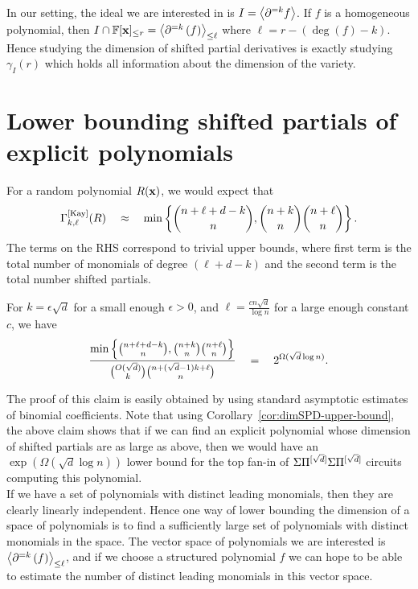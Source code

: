 In our setting, the ideal we are interested in is $I = \left\langle\partial^{=k}f\right\rangle$. If $f$ is a homogeneous polynomial, then $I \cap \mathbb{F}[\mathbf{x}]_{\leq r} = \left\langle\partial^{=k}\left(f\right)\right\rangle_{\leq \ell}$ where $\ell = r - (\deg(f) - k)$. Hence studying the dimension of shifted partial derivatives is exactly studying $\gamma_I(r)$ which holds all information about the dimension of the variety. 

\section{Lower bounding shifted partials of explicit polynomials}

For a random polynomial $R(\mathbf{x})$, we would expect that
$$
\Gamma^{\mathrm{[Kay]}}_{k,\ell}(R) \quad \approx \quad \min\left\{\binom{n + \ell + d -k}{n}, \binom{n+k}{n} \binom{n+\ell}{n}\right\}.
$$
The terms on the RHS correspond to trivial upper bounds, where first term is the total number of monomials of degree $(\ell + d-k)$ and the second term is the total number shifted partials.  

\begin{claim}\label{clm:spd-ratio}
For $k = \epsilon \sqrt{d}$ for a small enough $\epsilon > 0$, and $\ell = \frac{c n\sqrt{d}}{\log n}$ for a large enough constant $c$, we have
$$
\frac{\min\left\{\binom{n + \ell + d -k}{n}, \binom{n+k}{n} \binom{n+\ell}{n}\right\}}{\binom{O(\sqrt{d})}{k}\binom{n + (\sqrt{d}-1)k + \ell}{n}} \quad = \quad 2^{\Omega(\sqrt{d}\log n)}.
$$
\end{claim}

The proof of this claim is easily obtained by using standard asymptotic estimates of binomial coefficients. Note that using Corollary~\ref{cor:dimSPD-upper-bound}, the above claim shows that if we can find an explicit polynomial whose dimension of shifted partials are as large as above, then we would have an $\exp(\Omega(\sqrt{d}\log n))$ lower bound for the top fan-in of $\Sigma\Pi^{[\sqrt{d}]}\Sigma\Pi^{[\sqrt{d}]}$ circuits computing this polynomial.\\


If we have a set of polynomials with distinct leading monomials, then they are clearly linearly independent. Hence one way of lower bounding the dimension of a space of polynomials is to find a sufficiently large set of polynomials with distinct monomials in the space. The vector space of polynomials we are interested is $\left\langle\partial^{=k}\left(f\right)\right\rangle_{\leq \ell}$, and if we choose a structured polynomial $f$ we can hope to be able to estimate the number of distinct leading monomials in this vector space. 

